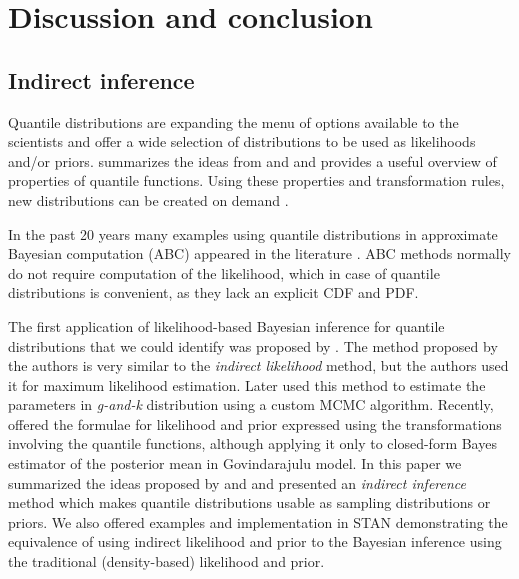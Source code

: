 \documentclass[
  12pt,
]{article}
\begin{document}
\hypertarget{discussion-and-conclusion}{%
\section{Discussion and conclusion}\label{discussion-and-conclusion}}

\hypertarget{indirect-inference}{%
\subsection{Indirect inference}\label{indirect-inference}}

Quantile distributions are expanding the menu of options available to the scientists and offer a wide selection of distributions to be used as likelihoods and/or priors. \citet{hadlock2017QuantileparameterizedMethodsQuantifying} summarizes the ideas from \citet{gilchrist2000StatisticalModellingQuantilea} and \citet{powley2013QuantileFunctionMethods} and provides a useful overview of properties of quantile functions. Using these properties and transformation rules, new distributions can be created on demand \citep{rodrigues2020FlexibleProcedureFormulating, midhu2014ClassDistributionsLinear, sankaran2016NewQuantileFunction, sankaran2018NewClassQuantile, yang2009QuantileBasedDistributionsModelling, smithson2017CDFquantileDistributionsModelling}.

In the past 20 years many examples using quantile distributions in approximate Bayesian computation (ABC) appeared in the literature \citetext{\citealp{allingham2009BayesianEstimationQuantile}; \citealp{drovandi2011LikelihoodfreeBayesianEstimation}; \citealp{dunson2005ApproximateBayesianInference}; \citealp{mcvinish2012ImprovingABCQuantile}; \citealp[and][]{smithson2017CDFquantileDistributionsModelling}}. ABC methods normally do not require computation of the likelihood, which in case of quantile distributions is convenient, as they lack an explicit CDF and PDF.

The first application of likelihood-based Bayesian inference for quantile distributions that we could identify was proposed by \citet{rayner2002NumericalMaximumLikelihood}. The method proposed by the authors is very similar to the \emph{indirect likelihood} method, but the authors used it for maximum likelihood estimation. Later \citet{haynes2005BayesianEstimationGandk} used this method to estimate the parameters in \emph{g-and-k} distribution using a custom MCMC algorithm. Recently, \citet{nair2020BayesianInferenceQuantile} offered the formulae for likelihood and prior expressed using the transformations involving the quantile functions, although applying it only to closed-form Bayes estimator of the posterior mean in Govindarajulu model. In this paper we summarized the ideas proposed by \citet{rayner2002NumericalMaximumLikelihood} and \citet{nair2020BayesianInferenceQuantile} and presented an \emph{indirect inference} method which makes quantile distributions usable as sampling distributions or priors. We also offered examples and implementation in STAN demonstrating the equivalence of using indirect likelihood and prior to the Bayesian inference using the traditional (density-based) likelihood and prior.
\end{document}
